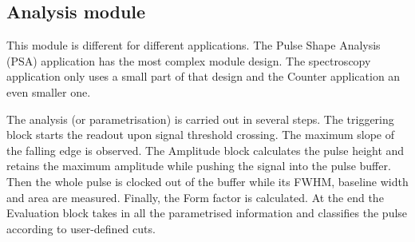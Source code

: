 \documentclass[12pt]{packages/mytustyle}  %
\begin{document}
\subsection{Analysis module}
\label{subsec:algorithm}
This module is different for different applications. The Pulse Shape Analysis (PSA) application has the most complex module design. The spectroscopy application only uses a small part of that design and the Counter application an even smaller one.



The analysis (or parametrisation) is carried out in several steps. The triggering block starts the readout upon signal threshold crossing. The maximum slope of the falling edge is observed. The Amplitude block calculates the pulse height and retains the maximum amplitude while pushing the signal into the pulse buffer. Then the whole pulse is clocked out of the buffer while its FWHM, baseline width and area are measured. Finally, the Form factor is calculated. At the end the Evaluation block takes in all the parametrised information and classifies the pulse according to user-defined cuts. 
\end{document}
